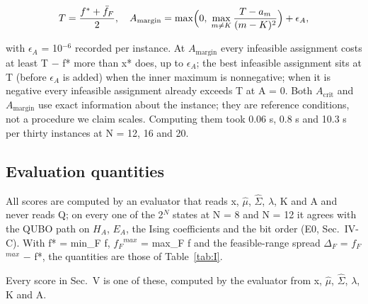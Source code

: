 \documentclass{ieeeaccess}
\begin{document}
\begin{equation*}
T = \frac{f^{*} + \bar{f}_F}{2},\quad A_{\mathrm{margin}} = \max\Bigl(0,\; \max_{m \neq K} \frac{T - a_m}{(m-K)^2}\Bigr) + \epsilon_A,
\end{equation*}


with $\epsilon_{A}$ = 10$^{-6}$ recorded per instance. At $A_{\mathrm{margin}}$ every infeasible assignment costs at least T $-$ f* more than x* does, up to $\epsilon_{A}$; the best infeasible assignment sits at T (before $\epsilon_{A}$ is added) when the inner maximum is nonnegative; when it is negative every infeasible assignment already exceeds T at A = 0. Both $A_{\mathrm{crit}}$ and $A_{\mathrm{margin}}$ use exact information about the instance; they are reference conditions, not a procedure we claim scales. Computing them took 0.06 s, 0.8 s and 10.3 s per thirty instances at N = 12, 16 and 20.


\subsection{Evaluation quantities}


All scores are computed by an evaluator that reads x, $\hat{\mu}$, $\hat{\Sigma}$, $\lambda$, K and A and never reads Q; on every one of the 2$^{N}$ states at N = 8 and N = 12 it agrees with the QUBO path on $H_{A}$, $E_{A}$, the Ising coefficients and the bit order (E0, Sec.~IV-C). With f* = min\_F f, $f_{F}$$^{max}$ = max\_F f and the feasible-range spread $\Delta_{F}$ = $f_{F}$$^{max}$ $-$ f*, the quantities are those of Table~\ref{tab:I}.


Every score in Sec.~V is one of these, computed by the evaluator from x, $\hat{\mu}$, $\hat{\Sigma}$, $\lambda$, K and A.
\end{document}
